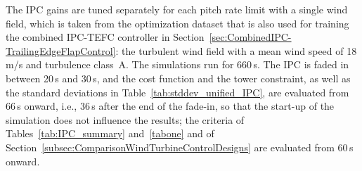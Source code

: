 The IPC gains are tuned separately for each pitch rate limit with a single wind field, which is taken from the optimization dataset that is also used for training the combined IPC-TEFC controller in Section~\ref{sec:CombinedIPC-TrailingEdgeFlapControl}: the turbulent wind field with a mean wind speed of 18\,m/s and turbulence class~A. The simulations run for 660\,s. The IPC is faded in between 20\,s and 30\,s, and the cost function and the tower constraint, as well as the standard deviations in Table~\ref{tab:stddev_unified_IPC}, are evaluated from 66\,s onward, i.e., 36\,s after the end of the fade-in, so that the start-up of the simulation does not influence the results; the criteria of Tables~\ref{tab:IPC_summary} and~\ref{tabone} and of Section~\ref{subsec:ComparisonWindTurbineControlDesigns} are evaluated from 60\,s onward. 

